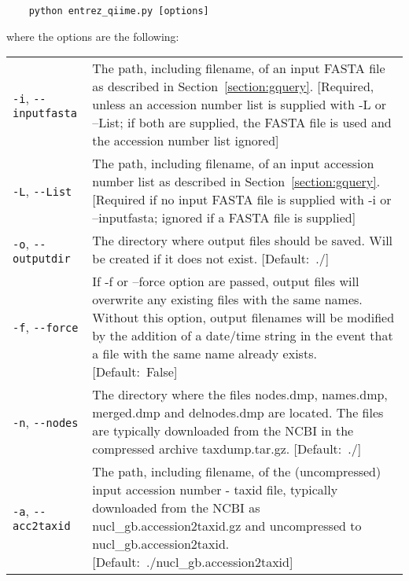 \documentclass[11pt]{amsart}
\begin{document}
\begin{verbatim}
    python entrez_qiime.py [options]
\end{verbatim}

where the options are the following:

\begin{longtable}{@{} p{1.4in} p{5.35in} @{}} %
      \verb|-i|, \verb|--inputfasta| & The path, including filename, of an input FASTA file as described in Section~\ref{section:gquery}. [Required, unless an accession number list is supplied with -L or --List; if both are supplied, the FASTA file is used and the accession number list ignored] \\
      \verb|-L|, \verb|--List| & The path, including filename, of an input accession number list as described in Section~\ref{section:gquery}. [Required if no input FASTA file is supplied with -i or --inputfasta; ignored if a FASTA file is supplied] \\
      \verb|-o|, \verb|--outputdir| & The directory where output files should be saved. Will be created if it does not exist. \mbox{[Default:~./]} \\
      \verb|-f|, \verb|--force| & If -f or --force option are passed, output files will overwrite any existing files with the same names. Without this option, output filenames will be modified by the addition of a date/time string in the event that a file with the same name already exists. \mbox{[Default:~False]} \\
      \verb|-n|, \verb|--nodes| & The directory where the files nodes.dmp, names.dmp, merged.dmp and delnodes.dmp are located. The files are typically downloaded from the NCBI in the compressed archive taxdump.tar.gz. \mbox{[Default: ./]} \\
      \verb|-a|, \verb|--acc2taxid| & The path, including filename, of the (uncompressed) input accession number - taxid file, typically downloaded from the NCBI as nucl\_gb.accession2taxid.gz and uncompressed to nucl\_gb.accession2taxid. \mbox{[Default:~./nucl\_gb.accession2taxid]} \\

\end{longtable}
\end{document}
